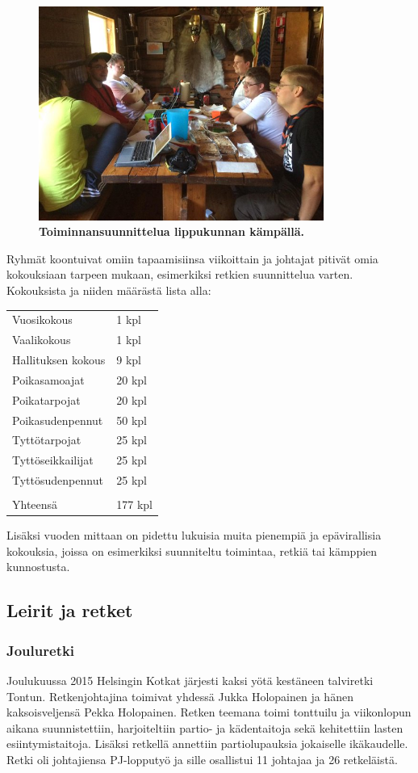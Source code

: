 \documentclass[a4paper, 12pt, finnish]{report} %
\begin{document}
\begin{figure}[htb]
	\begin{center}
		\includegraphics[height=7cm]{kokous.jpg}
	\end{center}
	\caption*{\textbf{Toiminnansuunnittelua lippukunnan kämpällä.}}
\end{figure}


Ryhmät koontuivat omiin tapaamisiinsa viikoittain ja johtajat pitivät omia kokouksiaan tarpeen mukaan, esimerkiksi retkien suunnittelua varten. Kokouksista ja niiden määrästä lista alla:\\
\begin{center}
	\begin{tabular}{ l l }
		Vuosikokous & 1 kpl\\
		Vaalikokous & 1 kpl\\
		Hallituksen kokous & 9 kpl\\
		Poikasamoajat & 20 kpl\\
		Poikatarpojat & 20 kpl\\
		Poikasudenpennut & 50 kpl\\
		Tyttötarpojat & 25 kpl\\
		Tyttöseikkailijat & 25 kpl\\
		Tyttösudenpennut & 25 kpl\\
			      & \\
		Yhteensä & 177 kpl\\
	\end{tabular}
\end{center}
Lisäksi vuoden mittaan on pidettu lukuisia muita pienempiä ja epävirallisia kokouksia, joissa on esimerkiksi suunniteltu toimintaa, retkiä tai kämppien kunnostusta.
\subsection{Leirit ja retket}
\subsubsection{Jouluretki}
Joulukuussa 2015 Helsingin Kotkat järjesti kaksi yötä kestäneen talviretki Tontun. Retkenjohtajina toimivat yhdessä Jukka Holopainen ja hänen kaksoisveljensä Pekka Holopainen. Retken teemana toimi tonttuilu ja viikonlopun aikana suunnistettiin, harjoiteltiin partio- ja kädentaitoja sekä kehitettiin lasten esiintymistaitoja. Lisäksi retkellä annettiin partiolupauksia jokaiselle ikäkaudelle. Retki oli johtajiensa PJ-lopputyö ja sille osallistui 11 johtajaa ja 26 retkeläistä.
\end{document}
